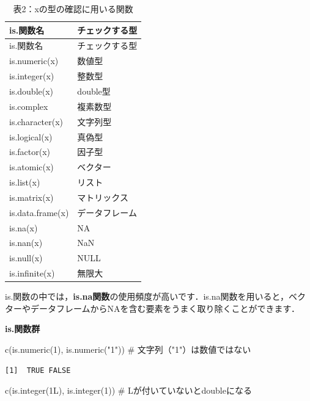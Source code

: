 \documentclass[
  letterpaper,
  DIV=11,
  numbers=noendperiod]{scrreprt}
\newenvironment{Shaded}{\begin{snugshade}}{\end{snugshade}}
\newcommand{\CommentTok}[1]{\textcolor[rgb]{0.37,0.37,0.37}{#1}}
\newcommand{\DecValTok}[1]{\textcolor[rgb]{0.68,0.00,0.00}{#1}}
\newcommand{\FunctionTok}[1]{\textcolor[rgb]{0.28,0.35,0.67}{#1}}
\newcommand{\NormalTok}[1]{\textcolor[rgb]{0.00,0.23,0.31}{#1}}
\newcommand{\StringTok}[1]{\textcolor[rgb]{0.13,0.47,0.30}{#1}}
\begin{document}
\begin{longtable}[]{@{}ll@{}}
\caption{表2：xの型の確認に用いる関数}\tabularnewline
\toprule()
is.関数名 & チェックする型 \\
\midrule()
\endfirsthead
\toprule()
is.関数名 & チェックする型 \\
\midrule()
\endhead
is.numeric(x) & 数値型 \\
is.integer(x) & 整数型 \\
is.double(x) & double型 \\
is.complex & 複素数型 \\
is.character(x) & 文字列型 \\
is.logical(x) & 真偽型 \\
is.factor(x) & 因子型 \\
is.atomic(x) & ベクター \\
is.list(x) & リスト \\
is.matrix(x) & マトリックス \\
is.data.frame(x) & データフレーム \\
is.na(x) & NA \\
is.nan(x) & NaN \\
is.null(x) & NULL \\
is.infinite(x) & 無限大 \\
\bottomrule()
\end{longtable}

is.関数の中では，\textbf{is.na関数}の使用頻度が高いです．is.na関数を用いると，ベクターやデータフレームからNAを含む要素をうまく取り除くことができます．

\textbf{is.関数群}

\begin{Shaded}
\begin{Highlighting}[]
\FunctionTok{c}\NormalTok{(}\FunctionTok{is.numeric}\NormalTok{(}\DecValTok{1}\NormalTok{), }\FunctionTok{is.numeric}\NormalTok{(}\StringTok{"1"}\NormalTok{)) }\CommentTok{\# 文字列（"1"）は数値ではない}
\end{Highlighting}
\end{Shaded}

\begin{verbatim}
[1]  TRUE FALSE
\end{verbatim}

\begin{Shaded}
\begin{Highlighting}[]
\FunctionTok{c}\NormalTok{(}\FunctionTok{is.integer}\NormalTok{(1L), }\FunctionTok{is.integer}\NormalTok{(}\DecValTok{1}\NormalTok{)) }\CommentTok{\# Lが付いていないとdoubleになる}
\end{Highlighting}
\end{Shaded}
\end{document}

